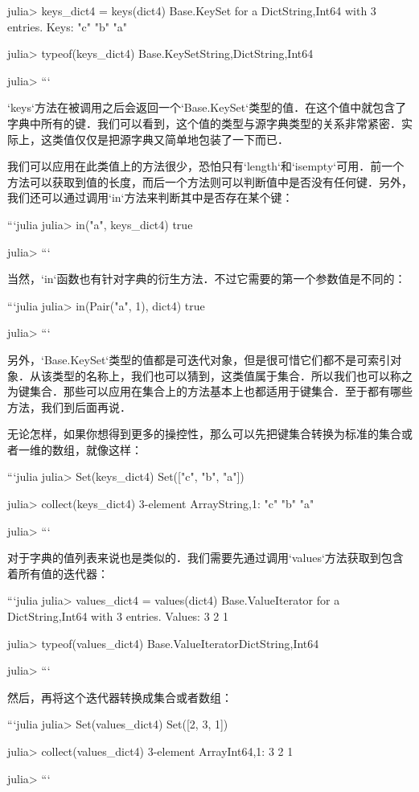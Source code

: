 julia> keys_dict4 = keys(dict4)
Base.KeySet for a Dict{String,Int64} with 3 entries. Keys:
  "c"
  "b"
  "a"

julia> typeof(keys_dict4)
Base.KeySet{String,Dict{String,Int64}}

julia> 
```

`keys`方法在被调用之后会返回一个`Base.KeySet`类型的值．在这个值中就包含了字典中所有的键．我们可以看到，这个值的类型与源字典类型的关系非常紧密．实际上，这类值仅仅是把源字典又简单地包装了一下而已．

我们可以应用在此类值上的方法很少，恐怕只有`length`和`isempty`可用．前一个方法可以获取到值的长度，而后一个方法则可以判断值中是否没有任何键．另外，我们还可以通过调用`in`方法来判断其中是否存在某个键：

```julia
julia> in("a", keys_dict4)
true

julia> 
```

当然，`in`函数也有针对字典的衍生方法．不过它需要的第一个参数值是不同的：

```julia
julia> in(Pair("a", 1), dict4)
true

julia> 
```

另外，`Base.KeySet`类型的值都是可迭代对象，但是很可惜它们都不是可索引对象．从该类型的名称上，我们也可以猜到，这类值属于集合．所以我们也可以称之为键集合．那些可以应用在集合上的方法基本上也都适用于键集合．至于都有哪些方法，我们到后面再说．

无论怎样，如果你想得到更多的操控性，那么可以先把键集合转换为标准的集合或者一维的数组，就像这样：

```julia
julia> Set(keys_dict4)
Set(["c", "b", "a"])

julia> collect(keys_dict4)
3-element Array{String,1}:
 "c"
 "b"
 "a"

julia> 
```

对于字典的值列表来说也是类似的．我们需要先通过调用`values`方法获取到包含着所有值的迭代器：

```julia
julia> values_dict4 = values(dict4)
Base.ValueIterator for a Dict{String,Int64} with 3 entries. Values:
  3
  2
  1

julia> typeof(values_dict4)
Base.ValueIterator{Dict{String,Int64}}

julia> 
```

然后，再将这个迭代器转换成集合或者数组：

```julia
julia> Set(values_dict4)
Set([2, 3, 1])

julia> collect(values_dict4)
3-element Array{Int64,1}:
 3
 2
 1

julia>
```

